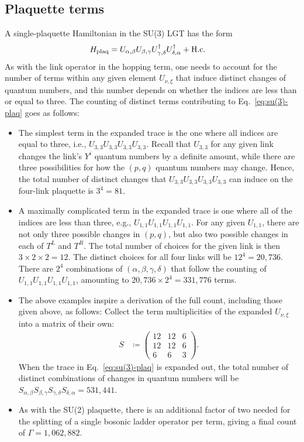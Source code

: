 \documentclass[aps,prd,twocolumn,showpacs,groupedaddress,superscriptaddress,nofootinbib,floatfix,preprintnumbers,longbibliography]{revtex4-1}
\begin{document}
\subsection{\label{sec: su(3) plaq counting}Plaquette terms}
A single-plaquette Hamiltonian in the SU(3) LGT has the form
%
\begin{align}
\label{eq:su(3)-plaq}
H_{\rm plaq}&= U_{\alpha,\beta} U_{\beta,\gamma}  U^\dagger_{\gamma,\delta} U^\dagger_{\delta,\alpha}+ \mathrm{H.c.}
\end{align}
%
As with the link operator in the hopping term, one needs to account for the number of terms within any given element $U_{\nu,\xi}$ that induce distinct changes of quantum numbers, and this number depends on whether the indices are less than or equal to three. The counting of distinct terms contributing to Eq.~\eqref{eq:su(3)-plaq} goes as follows: 
%
\begin{itemize}
    \item[$\diamond$] The simplest term in the expanded trace is the one where all indices are equal to three, i.e., $U_{3,3} U_{3,3} U_{3,3} U_{3,3}$. Recall that $U_{3,3}$ for any given link changes the link's $Y^i$ quantum numbers by a definite amount, while there are three possibilities for how the $(p,q)$ quantum numbers may change. Hence, the total number of distinct changes that $U_{3,3} U_{3,3} U_{3,3} U_{3,3}$ can induce on the four-link plaquette is $3^4=81$.
    \item[$\diamond$] A maximally complicated term in the expanded trace is one where all of the indices are less than three, e.g., $U_{1,1} U_{1,1} U_{1,1} U_{1,1}$.
    For any given $U_{1,1}$, there are not only three possible changes in $(p,q)$, but also two possible changes in each of $T^L$ and $T^R$. The total number of choices for the given link is then $3\times2\times2=12$. The distinct choices for all four links will be $12^4=20,736$. There are $2^4$ combinations of $(\alpha,\beta,\gamma,\delta)$ that follow the counting of $U_{1,1}U_{1,1}U_{1,1}U_{1,1}$, amounting to $20,736 \times 2^4 = 331,776$ terms.
    \item[$\diamond$] The above examples inspire a derivation of the full count, including those given above, as follows: Collect the term multiplicities of the expanded $U_{\nu,\xi}$ into a matrix of their own:
    \begin{align}
        S &\coloneq 
        \left( \begin{array}{ccc}
             12 & 12 & 6 \\
             12 & 12 & 6 \\
             6 & 6 & 3
        \end{array} \right).
    \end{align}
    When the trace in Eq.~\eqref{eq:su(3)-plaq} is expanded out, the total number of distinct combinations of changes in quantum numbers will be $S_{\alpha,\beta} S_{\beta,\gamma} S_{\gamma,\delta} S_{\delta,\alpha} = 531,441$.
    \item[$\diamond$] As with the SU(2) plaquette, there is an additional factor of two needed for the splitting of a single bosonic ladder operator per 
    term, giving a final count of $\Gamma=1,062,882$.
\end{itemize}
%
\end{document}
